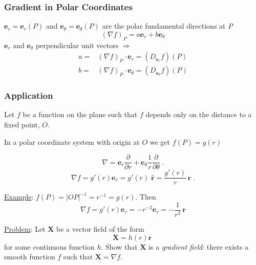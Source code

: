 \begin{frame}
  \frametitle{Gradient in Polar Coordinates}
  $\textbf{e}_r=\textbf{e}_r(P)$ and $\textbf{e}_\theta=\textbf{e}_\theta(P)$ are the polar fundamental directions at $P$
%
$$(\nabla f)_P = a \textbf{e}_r + b \textbf{e}_\theta$$
%
\pause
$\textbf{e}_r$ and $\textbf{e}_\theta$ perpendicular unit vectors $\Longrightarrow$
%
\begin{align*}
  a=& (\nabla f)_P \cdot \textbf{e}_r = (D_{\textbf{e}_r} f)(P) \\
  b=& (\nabla f)_P \cdot \textbf{e}_\theta = (D_{\textbf{e}_\theta} f)(P)
\end{align*}
%
\begin{overlayarea}{\textheight}{5cm}
%
%
\end{overlayarea}
\end{frame}

\begin{frame}
  \frametitle{Application}
  Let $f$ be a function on the plane such that $f$ depends only on the distance to a fixed point, $O$.

\pause
  In a polar coordinate system with origin at $O$ we get $f(P) = g(r)$

  $$\nabla = \textbf{e}_r \frac{\partial }{\partial r} + \textbf{e}_\theta \frac{1}{r} \frac{\partial }{\partial \theta}\; .$$
%
$$\nabla f = g'(r) \textbf{e}_r = g'(r) \; \widehat{\textbf{r}} = \frac{g'(r)}{r}\, \textbf{r}\; .$$

\pause
\underline{Example}: $f(P) = |OP|^{-1}= r^{-1}=g(r)$. Then
%
$$\nabla f = g'(r)\textbf{e}_r = - r^{-2} \textbf{e}_r = -\frac{1}{r^3} \, \textbf{r}$$

\pause
\underline{Problem}: Let $\textbf{X}$ be a vector field of the form
%
$$\textbf{X} = h(r) \textbf{r}\; $$
%
for some continuous function $h$. Show that $\textbf{X}$ is a \emph{gradient field}: there exists a smooth function $f$ such that $\textbf{X} = \nabla f$.
\end{frame}

